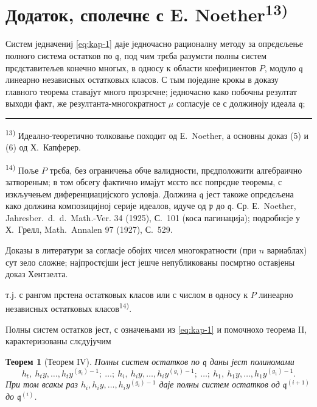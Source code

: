 \documentclass[11pt]{article}
\newcommand{\foreign}[1]{#1}
\theoremstyle{plain}
\newtheorem{satz}{Теорем}
\begin{document}
\newpage
\section*{Додаток, сполечнє с E. Noether\textsuperscript{13)}}

Систем једначениј \eqref{eq:kap-1} даје једночасно рационалну
методу за опрєдєљење полного система остатков по $\mathfrak{q}$,
под чим трєба разумєти полны систем прєдставитељев конечно многых,
в односу к области коефициентов $P$, модуло $\mathfrak{q}$ линеарно
независных остатковых класов. С тым поједине крокы в доказу
главного теорема ставајут много прозрєчне; једночасно како
побочны резултат выходи факт, же резултанта-многократност $\mu$
согласује се с должиноју идеала $\mathfrak{q}$;

\vspace{0.5em}
\noindent\rule{\textwidth}{0.4pt}
\vspace{0.3em}

{\footnotesize
\textsuperscript{13)} Идеално-теоретично толковање походит од Е.\ Noether, а основны
доказ (5) и (6) од Х.\ Капферер.

\textsuperscript{14)} Поље $P$ трєба, без ограничења обче валидности, прєдположити
алгебраично затвореным; в том обсегу фактично имајут мєсто всє попрєдне
теоремы, с изкључењем диференциацијского условја. Должина
$\mathfrak{q}$ јест такоже опрєдєљена како должина композицијној
серије идеалов, идуче од $\mathfrak{p}$ до $\mathfrak{q}$. Ср.
Е.\ Noether, \foreign{Jahresber.\ d.\ d.\ Math.-Ver.} 34 (1925), С.~101
(коса пагинација); подробнєје у Х.\ Грелл, \foreign{Math.\ Annalen} 97
(1927), С.~529.

Доказы в литератури за согласје обојих чисел многократности (при
$n$ вариаблах) сут зело сложне; најпростєјши јест јешче непубликованы
посмртно оставјены доказ Хентзелта.
}

\vspace{1em}
т.ј. с рангом прстена остатковых класов или с числом в односу к $P$
линеарно независных остатковых класов\textsuperscript{14)}.

Полны систем остатков јест, с означењами из \eqref{eq:kap-1} и
помочнохо теорема II, карактеризованы слєдујучим

\begin{satz}[Теорем IV]\label{satz:kap-IV}
Полны систем остатков по $\mathfrak{q}$ даны јест полиномами
\[
h_{t},\ h_{t}y,\ldots,h_{t}y^{(g_{t})-1};\ \ldots;\
h_{i},\ h_{i}y,\ldots,h_{i}y^{(g_{i})-1};\ \ldots;\
h_{1},\ h_{1}y,\ldots,h_{1}y^{(g_{1})-1}.
\]
При том всакы раз
$h_{i}, h_{i}y, \ldots, h_{i}y^{(g_{i})-1}$ даје полны
систем остатков од $\mathfrak{q}^{(i+1)}$ до
$\mathfrak{q}^{(i)}$.
\end{satz}
\end{document}
